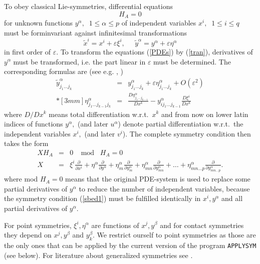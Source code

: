 To obey classical Lie-symmetries, differential equations
\begin{equation}
H_A = 0              \label{PDEs}
\end{equation}
for unknown functions $y^\alpha,\;\;1\leq \alpha \leq p$
of independent variables $x^i,\;\;1\leq i \leq q$
must be forminvariant against infinitesimal transformations
\begin{equation}
\tilde{x}^i = x^i + \varepsilon \xi^i, \;\; \;\;\;
        \tilde{y}^\alpha = y^\alpha + \varepsilon \eta^\alpha  \label{tran}
\end{equation}
in first order of $\varepsilon.$ To transform the equations (\ref{PDEs})
by (\ref{tran}), derivatives of $y^\alpha$ must be transformed, i.e. the part
linear in $\varepsilon$ must be determined. The corresponding formulas are
(see e.g. \cite{Olv}, \cite{Step})
\begin{eqnarray}
\tilde{y}^\alpha_{j_1\ldots j_k} & = &
y^\alpha_{j_1\ldots j_k} + \varepsilon
\eta^\alpha_{j_1\ldots j_k} + O(\varepsilon^2)  \nonumber \\*[3mm]
\eta^\alpha_{j_1\ldots j_{k-1}j_k} & = &
  \frac{D \eta^\alpha_{j_1\ldots j_{k-1}}}{D x^k} -
  y^\alpha_{ij_1\ldots j_{k-1}}\frac{D \xi^i}{D x^k} \label{recur}
\end{eqnarray}
where $D/Dx^k$ means total differentiation w.r.t.\ $x^k$ and
from now on lower latin indices of functions $y^\alpha,$ 
(and later $u^\alpha$)
denote partial differentiation w.r.t.\ the independent variables $x^i,$
(and later $v^i$).
The complete symmetry condition then takes the form
\begin{eqnarray}
X H_A & = & 0 \;\; \; \; \mbox{mod} \; \; \; H_A = 0\  \label{sbed1} \\
X & = & \xi^i \frac{\partial}{\partial x^i} +
 \eta^\alpha \frac{\partial}{\partial y^\alpha} +
 \eta^\alpha_m \frac{\partial}{\partial y^\alpha_m} +
 \eta^\alpha_{mn} \frac{\partial}{\partial y^\alpha_{mn}} + \ldots +
 \eta^\alpha_{mn\ldots p} \frac{\partial}{\partial y^\alpha_{mn\ldots p}}.
\label{sbed2}
\end{eqnarray}
where mod $H_A = 0$ means that the original PDE-system is used to replace
some partial derivatives of $y^\alpha$ to reduce the number of independent
variables, because the symmetry condition (\ref{sbed1}) must be
fulfilled identically in $x^i, y^\alpha$ and all partial
derivatives of $y^\alpha.$

For point symmetries, $\xi^i, \eta^\alpha$ are functions of $x^j,
y^\beta$ and for contact symmetries they depend on $x^j, y^\beta$ and
$y^\beta_k.$ We restrict ourself to point symmetries as those are the only
ones that can be applied by the current version of the program \texttt{APPLYSYM}
(see below). For literature about generalized symmetries see \cite{WHer}.


